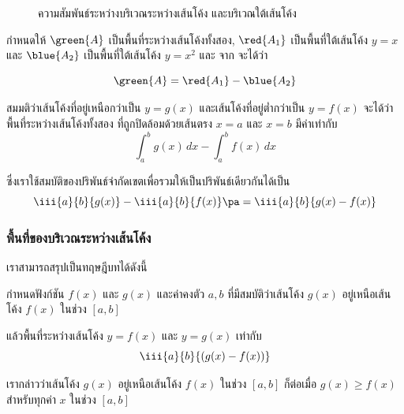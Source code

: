 \begin{frame}
\begin{figure}[h!]
\centering
{}
\caption{ความสัมพันธ์ระหว่างบริเวณระหว่างเส้นโค้ง และบริเวณใต้เส้นโค้ง}
\label{fig:int_area_proof}
\end{figure}

กำหนดให้ $\green{A}$ เป็นพื้นที่ระหว่างเส้นโค้งทั้งสอง, $\red{A_1}$ เป็นพื้นที่ใต้เส้นโค้ง $y=x$ และ $\blue{A_2}$ เป็นพื้นที่ใต้เส้นโค้ง $y = x^2$ และ  จาก จะได้ว่า

\[ \green{A} = \red{A_1} - \blue{A_2}\]
\end{frame}

\begin{frame}
สมมติว่าเส้นโค้งที่อยู่เหนือกว่าเป็น $y = g(x)$ และเส้นโค้งที่อยู่ต่ำกว่าเป็น $y = f(x)$ \pa จะได้ว่าพื้นที่ระหว่างเส้นโค้งทั้งสอง ที่ถูกปิดล้อมด้วยเส้นตรง $x=a$ และ $x=b$ \pa มีค่าเท่ากับ 
\[ \int_a^b g(x) \, dx- \int_a^b f(x) \, dx\]

\pa ซึ่งเราใช้สมบัติของปริพันธ์จำกัดเขตเพื่อรวมให้เป็นปริพันธ์เดียวกันได้เป็น \pa
\[ \iii{a}{b}{g(x)} - \iii{a}{b}{f(x)} \pa = \iii{a}{b}{g(x) - f(x)} \]
\end{frame}

\begin{frame}
\frametitle{พื้นที่ของบริเวณระหว่างเส้นโค้ง}
เราสามารถสรุปเป็นทฤษฎีบทได้ดังนี้
\begin{thm}{}{}
กำหนดฟังก์ชัน $f(x)$ และ $g(x)$ \pa และค่าคงตัว $a, b$ \pa ที่มีสมบัติว่าเส้นโค้ง $g(x)$ อยู่เหนือเส้นโค้ง $f(x)$ ในช่วง $[a,b]$

แล้วพื้นที่ระหว่างเส้นโค้ง $y = f(x)$ และ $y = g(x)$ เท่ากับ \pa
\begin{equation}
\iii{a}{b}{(g(x) - f(x))}
\end{equation}
\end{thm}

เรากล่าวว่าเส้นโค้ง $g(x)$ อยู่เหนือเส้นโค้ง $f(x)$ ในช่วง $[a,b]$ \pa ก็ต่อเมื่อ $g(x) \geq f(x)$ สำหรับทุกค่า $x$ ในช่วง $[a,b]$
\end{frame}

